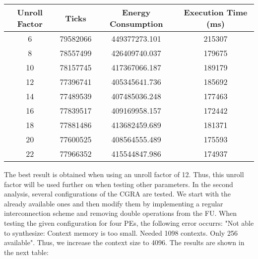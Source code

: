 		\begin{center}
			\begin{tabular}{||c | c c c ||} 
			\hline
			Unroll Factor & Ticks & Energy Consumption & Execution Time (ms)\\ [0.5ex] 
			\hline\hline
			6 & 79582066 & 449377273.101 & 215307 \\
			\hline
			8 & 78557499 & 426409740.037 & 179675 \\
			\hline
			10 & 78157745 & 417367066.187 & 189179 \\
			\hline
			12 & 77396741 & 405345641.736 & 185692 \\
			\hline
			14 & 77489539 & 407485036.248 & 177463 \\  
			\hline
			16 & 77839517 & 409169958.157 & 172442 \\  
			\hline
			18 & 77881486 & 413682459.689 & 181371 \\ 
			\hline
			20 & 77600525 & 408564555.489 & 175593 \\  
			\hline
			22 & 77966352 & 415544847.986 & 174937 \\
			\hline
			\end{tabular}
		\end{center}
	  
		The best result is obtained when using an unroll factor of \num{12}. Thus, this unroll factor will be used further on when testing other parameters. \newline
		In the second analysis, several configurations of the CGRA are tested. We start with the already available ones and then modify them by implementing a regular interconnection scheme and removing double operations from the FU. When testing the given configuration for four PEs, the following error occurrs: "Not able to synthesize: Context memory is too small. Needed \num{1098} contexts. Only \num{256} available". Thus, we increase the context size to \num{4096}. The results are shown in the next table:
  
